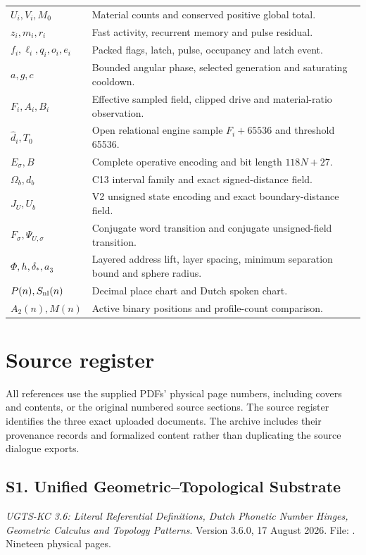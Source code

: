 \documentclass[11pt,a4paper]{article}
\numberwithin{equation}{section}
\newcommand{\newsec}[1]{\clearpage\section{#1}}
\begin{document}
\begin{longtable}{@{}p{}p{}@{}}
$U_i,V_i,M_0$ & Material counts and conserved positive global total.\\[5pt]
$z_i,m_i,r_i$ & Fast activity, recurrent memory and pulse residual.\\[5pt]
$f_i,\ell_i,q_i,o_i,e_i$ & Packed flags, latch, pulse, occupancy and latch event.\\[5pt]
$a,g,c$ & Bounded angular phase, selected generation and saturating cooldown.\\[5pt]
$F_i,A_i,B_i$ & Effective sampled field, clipped drive and material-ratio observation.\\[5pt]
$\widehat d_i,T_0$ & Open relational engine sample $F_i+65536$ and threshold 65536.\\[5pt]
$E_\sigma,B$ & Complete operative encoding and bit length $118N+27$.\\[5pt]
$\Omega_b,d_b$ & C13 interval family and exact signed-distance field.\\[5pt]
$J_U,U_b$ & V2 unsigned state encoding and exact boundary-distance field.\\[5pt]
$F_\sigma,\Psi_{U,\sigma}$ & Conjugate word transition and conjugate unsigned-field transition.\\[5pt]
$\Phi,h,\delta_*,a_3$ & Layered address lift, layer spacing, minimum separation bound and sphere radius.\\[5pt]
$P(n),S_{\rm nl}(n)$ & Decimal place chart and Dutch spoken chart.\\[5pt]
$A_2(n),M(n)$ & Active binary positions and profile-count comparison.\\[5pt]
\end{longtable}

\newsec{Source register}
\label{app:sources}
All references use the supplied PDFs' physical page numbers, including covers and contents, or the original numbered source sections. The source register identifies the three exact uploaded documents. The archive includes their provenance records and formalized content rather than duplicating the source dialogue exports.

\subsection*{S1. Unified Geometric--Topological Substrate}
\emph{UGTS-KC 3.6: Literal Referential Definitions, Dutch Phonetic Number Hinges, Geometric Calculus and Topology Patterns}. Version 3.6.0, 17 August 2026. File: . Nineteen physical pages.
\end{document}
